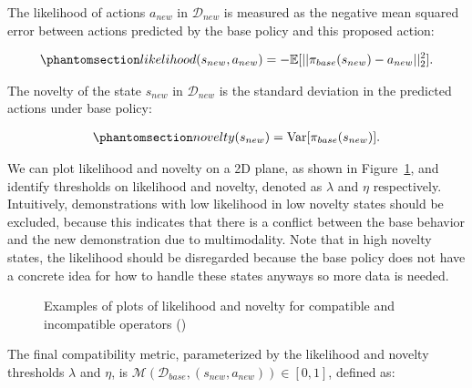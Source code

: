 \documentclass[
  letterpaper,
  numbers=noenddot,
  DIV=11]{scrreprt}
\theoremstyle{definition}
\theoremstyle{plain}
\theoremstyle{plain}
\theoremstyle{remark}
\begin{document}
The likelihood of actions \(a_{new}\) in \(\mathcal{D}_{new}\) is
measured as the negative mean squared error between actions predicted by
the base policy and this proposed action:

\begin{equation}\phantomsection\label{eq-eq3.61}{\begin{aligned}
    likelihood(s_{new}, a_{new}) = -\mathbb{E}[|| \pi_{base}(s_{new}) - a_{new} ||^2_2].
\end{aligned}}\end{equation}

The novelty of the state \(s_{new}\) in \(\mathcal{D}_{new}\) is the
standard deviation in the predicted actions under base policy:

\begin{equation}\phantomsection\label{eq-eq3.62}{\begin{aligned}
    novelty(s_{new}) = \mathrm{Var}[\pi_{base}(s_{new})].
\end{aligned}}\end{equation}

We can plot likelihood and novelty on a 2D plane, as shown in
Figure~\ref{fig-likelihood_novelty}, and identify thresholds on
likelihood and novelty, denoted as \(\lambda\) and \(\eta\)
respectively. Intuitively, demonstrations with low likelihood in low
novelty states should be excluded, because this indicates that there is
a conflict between the base behavior and the new demonstration due to
multimodality. Note that in high novelty states, the likelihood should
be disregarded because the base policy does not have a concrete idea for
how to handle these states anyways so more data is needed.

\begin{figure}


\caption{\label{fig-likelihood_novelty}Examples of plots of likelihood
and novelty for compatible and incompatible operators
()}

\end{figure}%

The final compatibility metric, parameterized by the likelihood and
novelty thresholds \(\lambda\) and \(\eta\), is
\(\mathcal{M}(\mathcal{D}_{base}, (s_{new}, a_{new})) \in [0, 1]\),
defined as:
\end{document}

